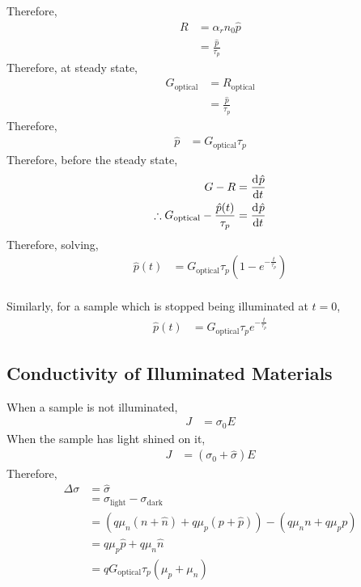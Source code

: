 \documentclass[titlepage, fleqn, a4paper, 12pt, twoside]{article}
\theoremstyle{definition}
\theoremstyle{theorem}
\let\Oldsubsection\subsection
\renewcommand{\subsection}{\FloatBarrier\Oldsubsection}
\begin{document}
Therefore,
\begin{align*}
	R &= \alpha_r n_0 \hat{p}\\
	&= \frac{\hat{p}}{\tau_p}
\end{align*}
Therefore, at steady state,
\begin{align*}
	G_{\text{optical}} &= R_{\text{optical}}\\
	&= \frac{\hat{p}}{\tau_p}
\end{align*}
Therefore,
\begin{align*}
	\hat{p} &= G_{\text{optical}} \tau_p
\end{align*}
Therefore, before the steady state,
\begin{align*}
	G - R &= \dod{\hat{p}}{t}\\
	\therefore G_{\text{optical}} - \frac{\hat{p}(t)}{\tau_p} &= \dod{\hat{p}}{t}
\end{align*}
Therefore, solving,
\begin{align*}
	\hat{p}(t) &= G_{\text{optical}} \tau_p \left( 1 - e^{-\frac{t}{\tau_p}} \right)
\end{align*}
~\\
Similarly, for a sample which is stopped being illuminated at $t = 0$,
\begin{align*}
	\hat{p}(t) &= G_{\text{optical}} \tau_p e^{-\frac{t}{\tau_p}}
\end{align*}

\subsection{Conductivity of Illuminated Materials}

When a sample is not illuminated,
\begin{align*}
	J &= \sigma_0 E
\end{align*}
When the sample has light shined on it,
\begin{align*}
	J &= \left( \sigma_0 + \hat{\sigma} \right) E
\end{align*}
Therefore,
\begin{align*}
	\Delta \sigma &= \hat{\sigma}\\
	&= \sigma_{\text{light}} - \sigma_{\text{dark}}\\
	&= \left( q \mu_n \left( n + \hat{n} \right) + q \mu_p \left( p + \hat{p} \right) \right) - \left( q \mu_n n + q \mu_p p  \right)\\
	&= q \mu_p \hat{p} + q \mu_n \hat{n}\\
	&= q G_{\text{optical}} \tau_p (\mu_p + \mu_n)
\end{align*}
\end{document}
